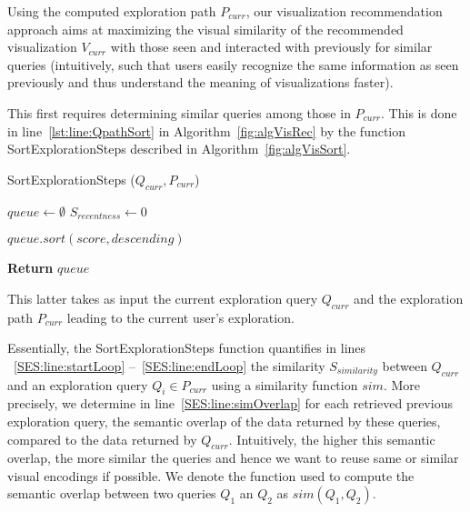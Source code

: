 Using the computed exploration path $P_{curr}$, our visualization recommendation approach aims at maximizing the visual similarity of the recommended visualization $V_{curr}$ with those seen and interacted with previously for similar queries (intuitively, such that users easily recognize the same information as seen previously and thus understand the meaning of visualizations faster). 


This first requires determining similar queries among those in $P_{curr}$. This is done in line~\ref{lst:line:QpathSort} in Algorithm~\ref{fig:algVisRec} by the function SortExplorationSteps described in Algorithm~\ref{fig:algVisSort}. 



  \begin{algorithm}[h]
   \caption{ SortExplorationSteps ($Q_{curr}, P_{curr}$)}
    \label{fig:algVisSort}
  $queue \leftarrow \emptyset$  \;
  {}
    $S_{recentness} \leftarrow 0$\;
    
            
 $queue.sort(score,descending)$\; {}

 
 \textbf{Return} $queue$\;
    \end{algorithm}

This latter takes as input the current exploration query $Q_{curr}$ and the exploration path $P_{curr}$ leading to the current user's exploration. 

Essentially, the SortExplorationSteps function quantifies in lines ~\ref{SES:line:startLoop} --~\ref{SES:line:endLoop} the similarity $S_{similarity}$ between $Q_{curr}$ and an exploration query $Q_i \in P_{curr}$ using a similarity function $sim$. 
More precisely, we determine in line~\ref{SES:line:simOverlap} for each retrieved previous exploration query, the semantic overlap of the data returned by these queries, compared to the data returned by $Q_{curr}$. Intuitively, the higher this semantic overlap, the more similar the queries and hence we want to reuse same or similar visual encodings if possible. We denote the function used to compute the semantic overlap between two queries $Q_1$ an $Q_2$ as $sim(Q_1, Q_2)$.

